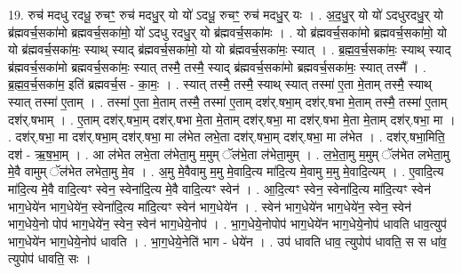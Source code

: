 \documentclass[17pt]{extarticle}
\begin{document}
19. रुच॑ मदधु रदधू॒ रुचꣳ॒॒ रुच॑ मदधु॒र् यो यो॑ ऽदधू॒ रुचꣳ॒॒ रुच॑ मदधु॒र् यः । . अ॒द॒धु॒र् यो यो॑ ऽदधुरदधु॒र् यो ब्र॑ह्मवर्च॒सका॑मो ब्रह्मवर्च॒सका॑मो॒ यो॑ ऽदधु रदधु॒र् यो ब्र॑ह्मवर्च॒सका॑मः । . यो ब्र॑ह्मवर्च॒सका॑मो ब्रह्मवर्च॒सका॑मो॒ यो यो ब्र॑ह्मवर्च॒सका॑मः॒ स्याथ् स्याद् ब्र॑ह्मवर्च॒सका॑मो॒ यो यो ब्र॑ह्मवर्च॒सका॑मः॒ स्यात् । . ब्र॒ह्म॒व॒र्च॒सका॑मः॒ स्याथ् स्याद् ब्र॑ह्मवर्च॒सका॑मो ब्रह्मवर्च॒सका॑मः॒ स्यात् तस्मै॒ तस्मै॒ स्याद् ब्र॑ह्मवर्च॒सका॑मो ब्रह्मवर्च॒सका॑मः॒ स्यात् तस्मै᳚ । . ब्र॒ह्म॒व॒र्च॒सका॑म॒ इति॑ ब्रह्मवर्च॒स - का॒मः॒ । . स्यात् तस्मै॒ तस्मै॒ स्याथ् स्यात् तस्मा॑ ए॒ता मे॒ताम् तस्मै॒ स्याथ् स्यात् तस्मा॑ ए॒ताम् । . तस्मा॑ ए॒ता मे॒ताम् तस्मै॒ तस्मा॑ ए॒ताम् दश॑र्.षभा॒म् दश॑र्.षभा मे॒ताम् तस्मै॒ तस्मा॑ ए॒ताम् दश॑र्.षभाम् । . ए॒ताम् दश॑र्.षभा॒म् दश॑र्.षभा मे॒ता मे॒ताम् दश॑र्.षभा॒ मा दश॑र्.षभा मे॒ता मे॒ताम् दश॑र्.षभा॒ मा । . दश॑र्.षभा॒ मा दश॑र्.षभा॒म् दश॑र्.षभा॒ मा ल॑भेत लभे॒ता दश॑र्.षभा॒म् दश॑र्.षभा॒ मा ल॑भेत । . दश॑र्.षभा॒मिति॒ दश॑ - ऋ॒ष॒भा॒म् । . आ ल॑भेत लभे॒ता ल॑भेता॒मु म॒मुम् ॅल॑भे॒ता ल॑भेता॒मुम् । . ल॒भे॒ता॒मु म॒मुम् ॅल॑भेत लभेता॒मु मे॒वै वामुम् ॅल॑भेत लभेता॒मु मे॒व । . अ॒मु मे॒वैवामु म॒मु मे॒वादि॒त्य मा॑दि॒त्य मे॒वामु म॒मु मे॒वादि॒त्यम् । . ए॒वादि॒त्य मा॑दि॒त्य मे॒वै वादि॒त्यꣳ स्वेन॒ स्वेना॑दि॒त्य मे॒वै वादि॒त्यꣳ स्वेन॑ । . आ॒दि॒त्यꣳ स्वेन॒ स्वेना॑दि॒त्य मा॑दि॒त्यꣳ स्वेन॑ भाग॒धेये॑न भाग॒धेये॑न॒ स्वेना॑दि॒त्य मा॑दि॒त्यꣳ स्वेन॑ भाग॒धेये॑न । . स्वेन॑ भाग॒धेये॑न भाग॒धेये॑न॒ स्वेन॒ स्वेन॑ भाग॒धेये॒नो पोप॑ भाग॒धेये॑न॒ स्वेन॒ स्वेन॑ भाग॒धेये॒नोप॑ । . भा॒ग॒धेये॒नोपोप॑ भाग॒धेये॑न भाग॒धेये॒नोप॑ धावति धाव॒त्युप॑ भाग॒धेये॑न भाग॒धेये॒नोप॑ धावति । . भा॒ग॒धेये॒नेति॑ भाग - धेये॑न । . उप॑ धावति धाव॒ त्युपोप॑ धावति॒ स स धा॑व॒ त्युपोप॑ धावति॒ सः । \newline
\end{document}
